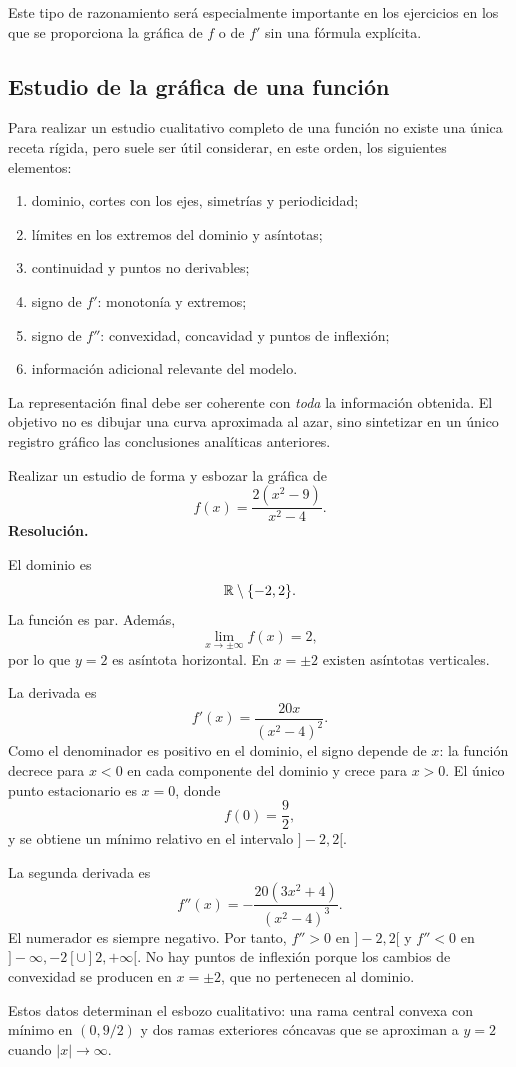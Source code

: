 Este tipo de razonamiento será especialmente importante en los ejercicios en los que se proporciona la gráfica de $f$ o de $f'$ sin una fórmula explícita.

\subsection{Estudio de la gráfica de una función}

Para realizar un estudio cualitativo completo de una función no existe una única receta rígida, pero suele ser útil considerar, en este orden, los siguientes elementos:
\begin{enumerate}
\item dominio, cortes con los ejes, simetrías y periodicidad;
\item límites en los extremos del dominio y asíntotas;
\item continuidad y puntos no derivables;
\item signo de $f'$: monotonía y extremos;
\item signo de $f''$: convexidad, concavidad y puntos de inflexión;
\item información adicional relevante del modelo.
\end{enumerate}

La representación final debe ser coherente con \emph{toda} la información obtenida. El objetivo no es dibujar una curva aproximada al azar, sino sintetizar en un único registro gráfico las conclusiones analíticas anteriores.

\begin{solvedexercise}
Realizar un estudio de forma y esbozar la gráfica de
\[
f(x)=\frac{2(x^2-9)}{x^2-4}.
\]
\tcblower
\textbf{Resolución.}\par\smallskip
El dominio es
\[
\mathbb{R}\setminus\{-2,2\}.
\]
La función es par. Además,
\[
\lim_{x\to\pm\infty}f(x)=2,
\]
por lo que $y=2$ es asíntota horizontal. En $x=\pm2$ existen asíntotas verticales.

La derivada es
\[
f'(x)=\frac{20x}{(x^2-4)^2}.
\]
Como el denominador es positivo en el dominio, el signo depende de $x$: la función decrece para $x<0$ en cada componente del dominio y crece para $x>0$. El único punto estacionario es $x=0$, donde
\[
f(0)=\frac92,
\]
y se obtiene un mínimo relativo en el intervalo $]-2,2[$.

La segunda derivada es
\[
f''(x)=-\frac{20(3x^2+4)}{(x^2-4)^3}.
\]
El numerador es siempre negativo. Por tanto, $f''>0$ en $]-2,2[$ y $f''<0$ en $]-\infty,-2[\cup]2,+\infty[$. No hay puntos de inflexión porque los cambios de convexidad se producen en $x=\pm2$, que no pertenecen al dominio.

Estos datos determinan el esbozo cualitativo: una rama central convexa con mínimo en $(0,9/2)$ y dos ramas exteriores cóncavas que se aproximan a $y=2$ cuando $|x|\to\infty$.
\end{solvedexercise}

